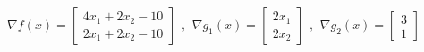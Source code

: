 \documentclass[11pt,a4paper]{article}
\begin{document}
\begin{equation}
    \begin{aligned}
        \nabla f(x)=\begin{bmatrix}
            4x_1+2x_2-10\\
            2x_1+2x_2-10
        \end{bmatrix}
    \end{aligned},
    \begin{aligned}
        \nabla g_1(x)=\begin{bmatrix}
            2x_1\\
            2x_2
        \end{bmatrix}
    \end{aligned},
    \begin{aligned}
        \nabla g_2(x)=\begin{bmatrix}
            3\\
            1
        \end{bmatrix}
    \end{aligned}
    \nonumber
\end{equation}
\end{document}

